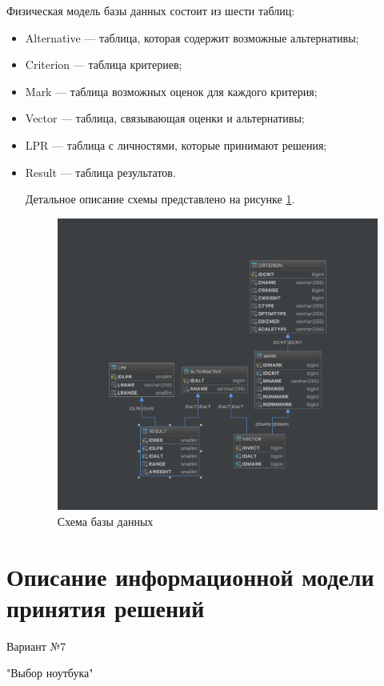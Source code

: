 \documentclass[titlepage]{article}
\begin{document}
Физическая модель базы данных состоит из шести таблиц:
\begin{itemize}
\item Alternative --- таблица, которая содержит возможные альтернативы;
\item Criterion --- таблица критериев;
\item Mark --- таблица возможных оценок для каждого критерия;
\item Vector --- таблица, связывающая оценки и альтернативы;
\item LPR --- таблица с личностями, которые принимают решения;
\item Result --- таблица результатов.

Детальное описание схемы представлено на рисунке \ref{fig:schema}.

\begin{figure}[h]
\includegraphics[scale=0.4]{schema}
\caption{Схема базы данных}
\label{fig:schema}
\end{figure}
\end{itemize}

\section*{Описание информационной модели принятия решений}

\begin{center}
Вариант №7

"Выбор ноутбука"
\end{center}
\end{document}
